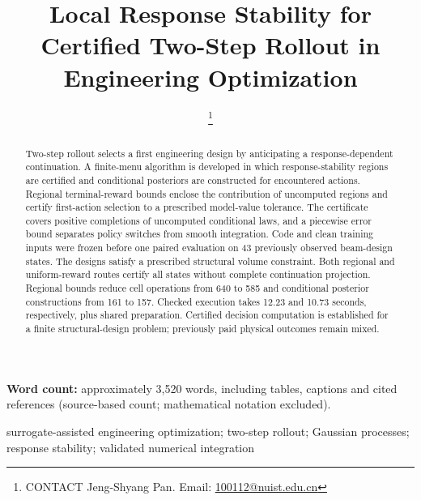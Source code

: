 \documentclass[]{interact}
\begin{document}
\title{Local Response Stability for Certified Two-Step Rollout in Engineering Optimization}
\author{
\thanks{CONTACT Jeng-Shyang Pan. Email: \href{mailto:100112@nuist.edu.cn}{100112@nuist.edu.cn}}
}
\maketitle
\noindent\textbf{Word count:} approximately 3,520 words, including tables, captions and cited references (source-based count; mathematical notation excluded).\par
\begin{abstract}
Two-step rollout selects a first engineering design by anticipating a response-dependent continuation. A finite-menu algorithm is developed in which response-stability regions are certified and conditional posteriors are constructed for encountered actions. Regional terminal-reward bounds enclose the contribution of uncomputed regions and certify first-action selection to a prescribed model-value tolerance. The certificate covers positive completions of uncomputed conditional laws, and a piecewise error bound separates policy switches from smooth integration. Code and clean training inputs were frozen before one paired evaluation on 43 previously observed beam-design states. The designs satisfy a prescribed structural volume constraint. Both regional and uniform-reward routes certify all states without complete continuation projection. Regional bounds reduce cell operations from 640 to 585 and conditional posterior constructions from 161 to 157. Checked execution takes 12.23 and 10.73 seconds, respectively, plus shared preparation. Certified decision computation is established for a finite structural-design problem; previously paid physical outcomes remain mixed.
\end{abstract}
\begin{keywords}
surrogate-assisted engineering optimization; two-step rollout; Gaussian processes; response stability; validated numerical integration
\end{keywords}
\end{document}
